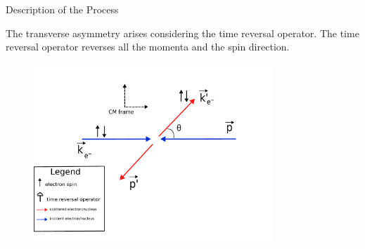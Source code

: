 \documentclass[9pt,a4paper]{beamer}
\begin{document}
\begin{frame}[noframenumbering]{Description of the Process}

The transverse asymmetry arises considering the time reversal operator. The time reversal operator reverses all the momenta and the spin direction.

\begin{figure}[hbtp]
\centering
\includegraphics[width = 0.8\textwidth]{figures/ScatteringScheme.pdf}
\end{figure}

\end{frame}
\end{document}
